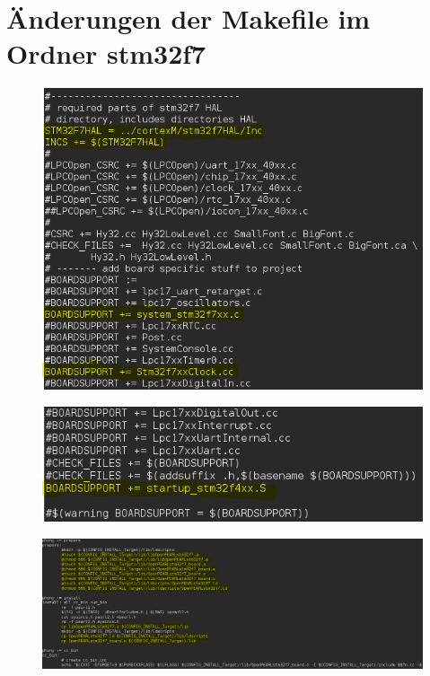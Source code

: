 \section{Änderungen der Makefile im Ordner stm32f7}\label{Änderungen der Makefile im Ordner stm32f7}
\begin{figure}[h]
\begin{center}
\includegraphics[width=13cm]{grafiken/Makefile_stm32f7_1.png}
\end{center}
\end{figure}

\begin{figure}[h]
\begin{center}
\includegraphics[width=13cm]{grafiken/Makefile_stm32f7_2.png}
\end{center}
\end{figure}
\newpage

\begin{figure}[h]
\begin{center}
\includegraphics[width=35cm]{grafiken/Makefile_stm32f7_3.png}
\end{center}
\end{figure}

